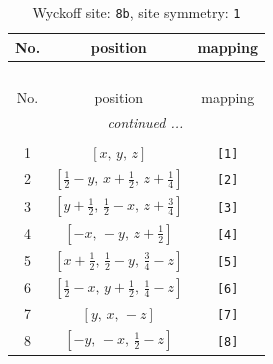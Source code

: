 \documentclass[fleqn,8pt]{jsarticle}
\begin{document}
\begin{longtable}{ccc}
\caption{Wyckoff site: {\tt 8b}, site symmetry: {\tt 1}}
 \\
 \hline \hline
No. & position & mapping \\ \hline \endfirsthead

\multicolumn{2}{l}{\tablename\ \thetable{}} \\
 \hline \hline
No. & position & mapping \\ \hline \endhead

 \hline \hline
\multicolumn{2}{r}{\footnotesize\it continued ...} \\ \endfoot

 \hline \hline
\multicolumn{2}{r}{} \\ \endlastfoot

1 & $\left[ x,\, y,\, z \right]$ & {\tt [1]} \\ \hline
2 & $\left[ \frac{1}{2} - y,\, x + \frac{1}{2},\, z + \frac{1}{4} \right]$ & {\tt [2]} \\ \hline
3 & $\left[ y + \frac{1}{2},\, \frac{1}{2} - x,\, z + \frac{3}{4} \right]$ & {\tt [3]} \\ \hline
4 & $\left[ - x,\, - y,\, z + \frac{1}{2} \right]$ & {\tt [4]} \\ \hline
5 & $\left[ x + \frac{1}{2},\, \frac{1}{2} - y,\, \frac{3}{4} - z \right]$ & {\tt [5]} \\ \hline
6 & $\left[ \frac{1}{2} - x,\, y + \frac{1}{2},\, \frac{1}{4} - z \right]$ & {\tt [6]} \\ \hline
7 & $\left[ y,\, x,\, - z \right]$ & {\tt [7]} \\ \hline
8 & $\left[ - y,\, - x,\, \frac{1}{2} - z \right]$ & {\tt [8]} \\
\end{longtable}
\end{document}
